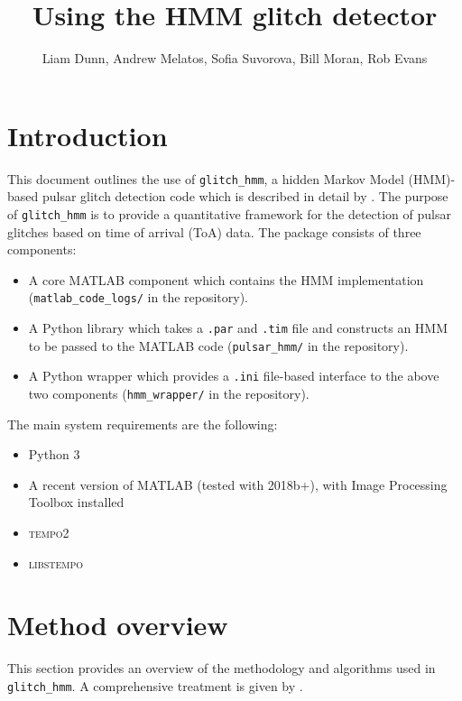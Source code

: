 \documentclass{article}
\title{Using the HMM glitch detector}
\author{Liam Dunn, Andrew Melatos, Sofia Suvorova, Bill Moran, Rob Evans}
\newcommand{\tempo}{\textsc{tempo}2}
\newcommand{\libstempo}{\textsc{libstempo}}
\newcommand{\glitchhmm}{\texttt{glitch\_hmm}}
\begin{document}
\maketitle
\tableofcontents
\section{Introduction}
This document outlines the use of \glitchhmm{}, a hidden Markov Model (HMM)-based pulsar glitch detection code which is described in detail by \citet{MelatosDunn2020}.
The purpose of \glitchhmm{} is to provide a quantitative framework for the detection of pulsar glitches based on time of arrival (ToA) data.
The package consists of three components:
\begin{itemize}
    \item A core MATLAB component which contains the HMM implementation (\texttt{matlab\_code\_logs/} in the repository).
    \item A Python library which takes a \texttt{.par} and \texttt{.tim} file and constructs an  HMM to be passed to the MATLAB code (\texttt{pulsar\_hmm/} in the repository).
    \item A Python wrapper which provides a \texttt{.ini} file-based interface to the above two components (\texttt{hmm\_wrapper/} in the repository).
\end{itemize}

The main system requirements are the following:
\begin{itemize}
    \item Python 3 
    \item A recent version of MATLAB (tested with 2018b+), with Image Processing Toolbox installed
    \item \tempo{}
    \item \libstempo{}
\end{itemize}

\section{Method overview}
This section provides an overview of the methodology and algorithms used in \glitchhmm{}. 
A comprehensive treatment is given by \citet{MelatosDunn2020}.
\end{document}
